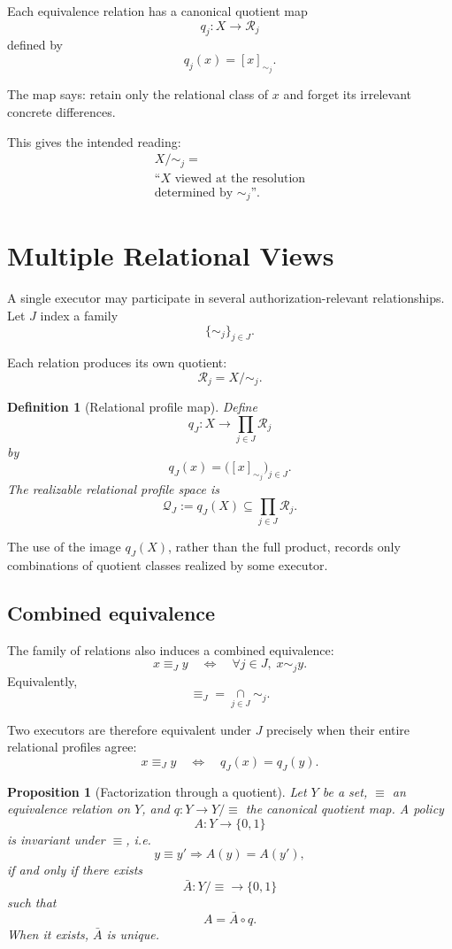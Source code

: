 \documentclass[10pt,twocolumn]{article}
\newcommand{\Rel}{\mathcal{R}}
\newcommand{\Profiles}{\mathcal{Q}}
\newtheorem{definition}{Definition}
\newtheorem{proposition}{Proposition}
\begin{document}
Each equivalence relation has a canonical quotient map
\[
q_j:X\rightarrow \Rel_j
\]
defined by
\[
q_j(x)=[x]_{\sim_j}.
\]

The map says: retain only the relational class of \(x\) and forget its
irrelevant concrete differences.

This gives the intended reading:
\[
\begin{gathered}
X/{\sim_j}
=\\
\text{``\(X\) viewed at the resolution}\\
\text{determined by \(\sim_j\)''.}
\end{gathered}
\]

\section{Multiple Relational Views}

A single executor may participate in several authorization-relevant
relationships. Let \(J\) index a family
\[
\{\sim_j\}_{j\in J}.
\]

Each relation produces its own quotient:
\[
\Rel_j=X/{\sim_j}.
\]

\begin{definition}[Relational profile map]
Define
\[
q_J:X\rightarrow \prod_{j\in J}\Rel_j
\]
by
\[
q_J(x)
=
\big(
[x]_{\sim_j}
\big)_{j\in J}.
\]
The realizable relational profile space is
\[
\Profiles_J
:=
q_J(X)
\subseteq
\prod_{j\in J}\Rel_j.
\]
\end{definition}

The use of the image \(q_J(X)\), rather than the full product, records only
combinations of quotient classes realized by some executor.

\subsection{Combined equivalence}

The family of relations also induces a combined equivalence:
\[
x\equiv_J y
\quad\Longleftrightarrow\quad
\forall j\in J,\;x\sim_j y.
\]
Equivalently,
\[
\equiv_J
=
\mathop{\cap}\limits_{j\in J}\sim_j.
\]

Two executors are therefore equivalent under \(J\) precisely when their entire
relational profiles agree:
\[
x\equiv_J y
\quad\Longleftrightarrow\quad
q_J(x)=q_J(y).
\]

\begin{proposition}[Factorization through a quotient]\label{prop:factorization}
Let \(Y\) be a set, \(\equiv\) an equivalence relation on \(Y\), and
\(q:Y\rightarrow Y/{\equiv}\) the canonical quotient map. A policy
\[
A:Y\rightarrow\{0,1\}
\]
is invariant under \(\equiv\), i.e.
\[
y\equiv y'
\Longrightarrow
A(y)=A(y'),
\]
if and only if there exists
\[
\bar A:Y/{\equiv}\rightarrow\{0,1\}
\]
such that
\[
A=\bar A\circ q.
\]
When it exists, \(\bar A\) is unique.
\end{proposition}
\end{document}
